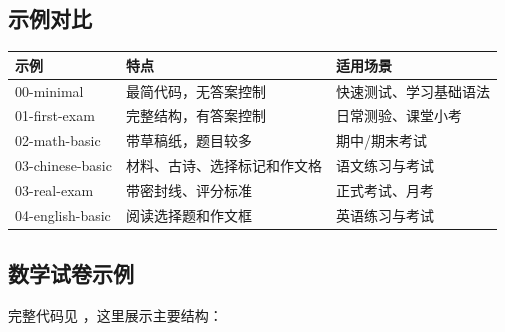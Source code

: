\subsection{示例对比}

\begin{center}
\begin{tabular}{lp{5cm}p{5cm}}
\hline
\textbf{示例} & \textbf{特点} & \textbf{适用场景} \\
\hline
00-minimal & 最简代码，无答案控制 & 快速测试、学习基础语法 \\
01-first-exam & 完整结构，有答案控制 & 日常测验、课堂小考 \\
02-math-basic & 带草稿纸，题目较多 & 期中/期末考试 \\
03-chinese-basic & 材料、古诗、选择标记和作文格 & 语文练习与考试 \\
03-real-exam & 带密封线、评分标准 & 正式考试、月考 \\
04-english-basic & 阅读选择题和作文框 & 英语练习与考试 \\
\hline
\end{tabular}
\end{center}

\subsection{数学试卷示例}

完整代码见 ，这里展示主要结构：

